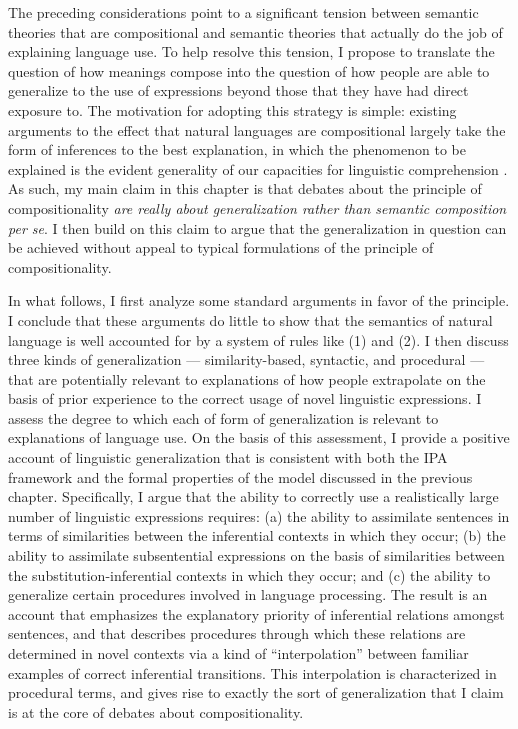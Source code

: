 The preceding considerations point to a significant tension between semantic theories that are compositional and semantic theories that actually do the job of explaining language use. To help resolve this tension, I propose to translate the question of how meanings compose into the question of how people are able to generalize to the use of expressions beyond those that they have had direct exposure to. The motivation for adopting this strategy is simple: existing arguments to the effect that natural languages are compositional largely take the form of inferences to the best explanation, in which the phenomenon to be explained is the evident generality of our capacities for linguistic comprehension \citep{Szabo:2013,Szabo:2012}. As such, my main claim in this chapter is that debates about the principle of compositionality \textit{are really about generalization rather than semantic composition per se}. I then build on this claim to argue that the generalization in question can be achieved without appeal to typical formulations of the principle of compositionality.

In what follows, I first analyze some standard arguments in favor of the principle. I conclude that these arguments do little to show that the semantics of natural language is well accounted for by a system of rules like (1) and (2). I then discuss three kinds of generalization --- similarity-based, syntactic, and procedural --- that are potentially relevant to explanations of how people extrapolate on the basis of prior experience to the correct usage of novel linguistic expressions. I assess the degree to which each of form of generalization is relevant to explanations of language use. On the basis of this assessment, I provide a positive account of linguistic generalization that is consistent with both the IPA framework and the formal properties of the model discussed in the previous chapter. Specifically, I argue that the ability to correctly use a realistically large number of linguistic expressions requires: (a) the ability to assimilate sentences in terms of similarities between the inferential contexts in which they occur; (b) the ability to assimilate subsentential expressions on the basis of similarities between the substitution-inferential contexts in which they occur; and (c) the ability to generalize certain procedures involved in language processing. The result is an account that emphasizes the explanatory priority of inferential relations amongst sentences, and that describes procedures through which these relations are determined in novel contexts via a kind of ``interpolation'' between familiar examples of correct inferential transitions. This interpolation is characterized in procedural terms, and gives rise to exactly the sort of generalization that I claim is at the core of debates about compositionality.

